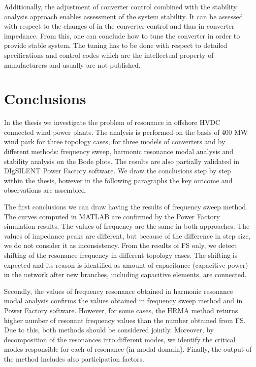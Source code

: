 \documentclass[a4paper,11pt,oneside]{report} %
\begin{document}
Additionally, the adjustment of converter control combined with the stability analysis approach enables assessment of the system stability. It can be assessed with respect to the changes of in the converter control and thus in converter impedance. From this, one can conclude how to tune the converter in order to provide stable system. The tuning has to be done with respect to detailed specifications and control codes which are the intellectual property of manufacturers and usually are not published.

\chapter{Conclusions}

In the thesis we investigate the problem of resonance in offshore HVDC connected wind power plants. The analysis is performed on the basis of 400 MW wind park for three topology cases, for three models of converters and by different methods: frequency sweep, harmonic resonance modal analysis and stability analysis on the Bode plots. The results are also partially validated in DIgSILENT Power Factory software. We draw the conclusions step by step within the thesis, however in the following paragraphs the key outcome and observations are assembled.

The first conclusions we can draw having the results of frequency sweep method. The curves computed in MATLAB are confirmed by the Power Factory simulation results. The values of frequency are the same in both approaches. The values of impedance peaks are different, but because of the difference in step size, we do not consider it as inconsistency. From the results of FS only, we detect shifting of the resonance frequency in different topology cases. The shifting is expected and its reason is identified as amount of capacitance (capacitive power) in the network after new branches, including capacitive elements, are connected.

Secondly, the values of frequency resonance obtained in harmonic resonance modal analysis confirms the values obtained in frequency sweep method and in Power Factory software. However, for some cases, the HRMA method returns higher number of resonant frequency values than the number obtained from FS. Due to this, both methods should be considered jointly. Moreover, by decomposition of the resonances into different modes, we identify the critical modes responsible for each of resonance (in modal domain). Finally, the output of the method includes also participation factors.
\end{document}
